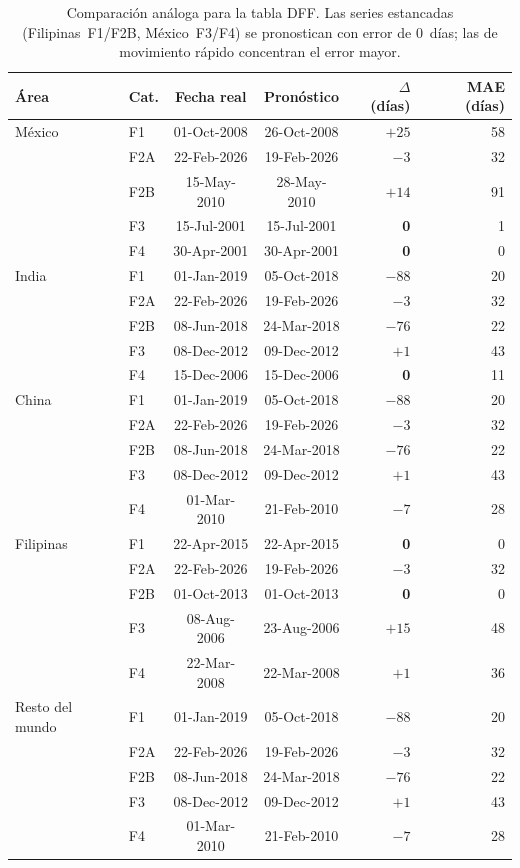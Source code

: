 \documentclass[12pt,letterpaper]{report}
\begin{document}
\begin{table}[H]
\centering
\footnotesize
\caption[Pronóstico vs.\ fecha real por categoría (DFF)]{Comparación análoga para la tabla
DFF. Las series estancadas (Filipinas~F1/F2B, México~F3/F4) se pronostican con error de
$0$~días; las de movimiento rápido concentran el error mayor.}
\label{tab:fcst_dff}
\begin{tabular}{llccrr}
\toprule
\rowcolor{uacjblue!15}
\textbf{Área} & \textbf{Cat.} & \textbf{Fecha real} & \textbf{Pronóstico} & \textbf{$\Delta$ (días)} & \textbf{MAE (días)} \\ \midrule
México & F1 & 01-Oct-2008 & 26-Oct-2008 & \textbf{$+25$} & 58 \\
 & F2A & 22-Feb-2026 & 19-Feb-2026 & \textbf{$-3$} & 32 \\
 & F2B & 15-May-2010 & 28-May-2010 & \textbf{$+14$} & 91 \\
 & F3 & 15-Jul-2001 & 15-Jul-2001 & \textbf{0} & 1 \\
 & F4 & 30-Apr-2001 & 30-Apr-2001 & \textbf{0} & 0 \\
India & F1 & 01-Jan-2019 & 05-Oct-2018 & $-88$ & 20 \\
 & F2A & 22-Feb-2026 & 19-Feb-2026 & \textbf{$-3$} & 32 \\
 & F2B & 08-Jun-2018 & 24-Mar-2018 & $-76$ & 22 \\
 & F3 & 08-Dec-2012 & 09-Dec-2012 & \textbf{$+1$} & 43 \\
 & F4 & 15-Dec-2006 & 15-Dec-2006 & \textbf{0} & 11 \\
China & F1 & 01-Jan-2019 & 05-Oct-2018 & $-88$ & 20 \\
 & F2A & 22-Feb-2026 & 19-Feb-2026 & \textbf{$-3$} & 32 \\
 & F2B & 08-Jun-2018 & 24-Mar-2018 & $-76$ & 22 \\
 & F3 & 08-Dec-2012 & 09-Dec-2012 & \textbf{$+1$} & 43 \\
 & F4 & 01-Mar-2010 & 21-Feb-2010 & \textbf{$-7$} & 28 \\
Filipinas & F1 & 22-Apr-2015 & 22-Apr-2015 & \textbf{0} & 0 \\
 & F2A & 22-Feb-2026 & 19-Feb-2026 & \textbf{$-3$} & 32 \\
 & F2B & 01-Oct-2013 & 01-Oct-2013 & \textbf{0} & 0 \\
 & F3 & 08-Aug-2006 & 23-Aug-2006 & \textbf{$+15$} & 48 \\
 & F4 & 22-Mar-2008 & 22-Mar-2008 & \textbf{$+1$} & 36 \\
Resto del mundo & F1 & 01-Jan-2019 & 05-Oct-2018 & $-88$ & 20 \\
 & F2A & 22-Feb-2026 & 19-Feb-2026 & \textbf{$-3$} & 32 \\
 & F2B & 08-Jun-2018 & 24-Mar-2018 & $-76$ & 22 \\
 & F3 & 08-Dec-2012 & 09-Dec-2012 & \textbf{$+1$} & 43 \\
 & F4 & 01-Mar-2010 & 21-Feb-2010 & \textbf{$-7$} & 28 \\
\bottomrule
\end{tabular}
\end{table}
\end{document}
